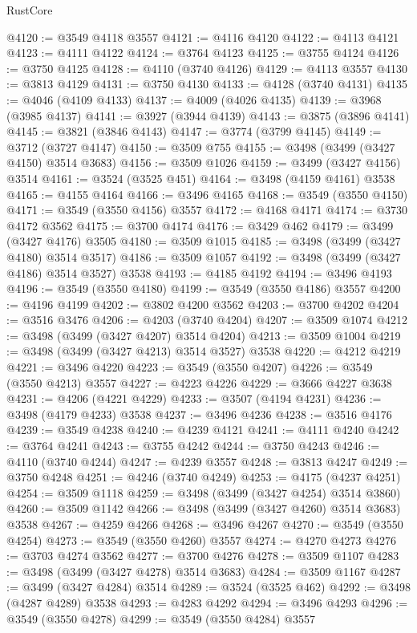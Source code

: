 \begin{lexlean}{RustCore}
\begin{coremodule}
@4120 := @3549 @4118 @3557
@4121 := @4116 @4120
@4122 := @4113 @4121
@4123 := @4111 @4122
@4124 := @3764 @4123
@4125 := @3755 @4124
@4126 := @3750 @4125
@4128 := @4110 (@3740 @4126)
@4129 := @4113 @3557
@4130 := @3813 @4129
@4131 := @3750 @4130
@4133 := @4128 (@3740 @4131)
@4135 := @4046 (@4109 @4133)
@4137 := @4009 (@4026 @4135)
@4139 := @3968 (@3985 @4137)
@4141 := @3927 (@3944 @4139)
@4143 := @3875 (@3896 @4141)
@4145 := @3821 (@3846 @4143)
@4147 := @3774 (@3799 @4145)
@4149 := @3712 (@3727 @4147)
@4150 := @3509 @755
@4155 := @3498 (@3499 (@3427 @4150) @3514 @3683)
@4156 := @3509 @1026
@4159 := @3499 (@3427 @4156) @3514
@4161 := @3524 (@3525 @451)
@4164 := @3498 (@4159 @4161) @3538
@4165 := @4155 @4164
@4166 := @3496 @4165
@4168 := @3549 (@3550 @4150)
@4171 := @3549 (@3550 @4156) @3557
@4172 := @4168 @4171
@4174 := @3730 @4172 @3562
@4175 := @3700 @4174
@4176 := @3429 @462
@4179 := @3499 (@3427 @4176) @3505
@4180 := @3509 @1015
@4185 := @3498 (@3499 (@3427 @4180) @3514 @3517)
@4186 := @3509 @1057
@4192 := @3498 (@3499 (@3427 @4186) @3514 @3527) @3538
@4193 := @4185 @4192
@4194 := @3496 @4193
@4196 := @3549 (@3550 @4180)
@4199 := @3549 (@3550 @4186) @3557
@4200 := @4196 @4199
@4202 := @3802 @4200 @3562
@4203 := @3700 @4202
@4204 := @3516 @3476
@4206 := @4203 (@3740 @4204)
@4207 := @3509 @1074
@4212 := @3498 (@3499 (@3427 @4207) @3514 @4204)
@4213 := @3509 @1004
@4219 := @3498 (@3499 (@3427 @4213) @3514 @3527) @3538
@4220 := @4212 @4219
@4221 := @3496 @4220
@4223 := @3549 (@3550 @4207)
@4226 := @3549 (@3550 @4213) @3557
@4227 := @4223 @4226
@4229 := @3666 @4227 @3638
@4231 := @4206 (@4221 @4229)
@4233 := @3507 (@4194 @4231)
@4236 := @3498 (@4179 @4233) @3538
@4237 := @3496 @4236
@4238 := @3516 @4176
@4239 := @3549 @4238
@4240 := @4239 @4121
@4241 := @4111 @4240
@4242 := @3764 @4241
@4243 := @3755 @4242
@4244 := @3750 @4243
@4246 := @4110 (@3740 @4244)
@4247 := @4239 @3557
@4248 := @3813 @4247
@4249 := @3750 @4248
@4251 := @4246 (@3740 @4249)
@4253 := @4175 (@4237 @4251)
@4254 := @3509 @1118
@4259 := @3498 (@3499 (@3427 @4254) @3514 @3860)
@4260 := @3509 @1142
@4266 := @3498 (@3499 (@3427 @4260) @3514 @3683) @3538
@4267 := @4259 @4266
@4268 := @3496 @4267
@4270 := @3549 (@3550 @4254)
@4273 := @3549 (@3550 @4260) @3557
@4274 := @4270 @4273
@4276 := @3703 @4274 @3562
@4277 := @3700 @4276
@4278 := @3509 @1107
@4283 := @3498 (@3499 (@3427 @4278) @3514 @3683)
@4284 := @3509 @1167
@4287 := @3499 (@3427 @4284) @3514
@4289 := @3524 (@3525 @462)
@4292 := @3498 (@4287 @4289) @3538
@4293 := @4283 @4292
@4294 := @3496 @4293
@4296 := @3549 (@3550 @4278)
@4299 := @3549 (@3550 @4284) @3557

\end{coremodule}
\end{lexlean}
